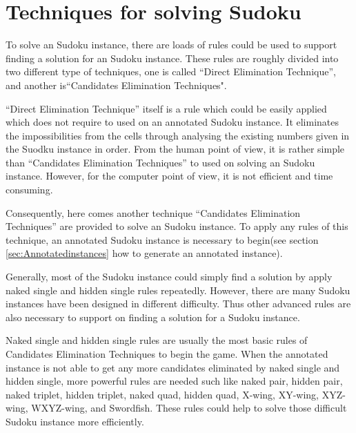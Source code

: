 \documentclass[11pt]{report}
\begin{document}
\chapter{Techniques for solving Sudoku}
\label{cha:Techniques}

To solve an Sudoku instance, there are loads of rules could be used to support finding a solution for an Sudoku instance. These rules are roughly divided into two different type of techniques, one is called “Direct Elimination Technique”, and another is“Candidates Elimination Techniques".

``Direct Elimination Technique'' itself is a rule which could be easily applied which does not require to used on an annotated Sudoku instance. It eliminates the impossibilities from the cells through analysing the existing numbers given in the Suodku instance in order. From the human point of view, it is rather simple than ``Candidates Elimination Techniques'' to used on solving an Sudoku instance. However, for the computer point of view, it is not efficient and time consuming.

Consequently, here comes another technique ``Candidates Elimination Techniques'' are provided to solve an Sudoku instance. To apply any rules of this technique, an annotated Sudoku instance is necessary to begin(see section \ref{sec:Annotatedinstances} how to generate an annotated instance). 

Generally, most of the Sudoku instance could simply find a solution by apply naked single and hidden single rules repeatedly. However, there are many Sudoku instances have been designed in different difficulty. Thus other advanced rules are also necessary to support on finding a solution for a Sudoku instance.

Naked single and hidden single rules are usually the most basic rules of Candidates Elimination Techniques to begin the game. When the annotated instance is not able to get any more candidates eliminated by naked single and hidden single, more powerful rules are needed such like naked pair, hidden pair, naked triplet, hidden triplet, naked quad, hidden quad, X-wing, XY-wing, XYZ-wing, WXYZ-wing, and Swordfish. These rules could help to solve those difficult Sudoku instance more efficiently.
\end{document}
